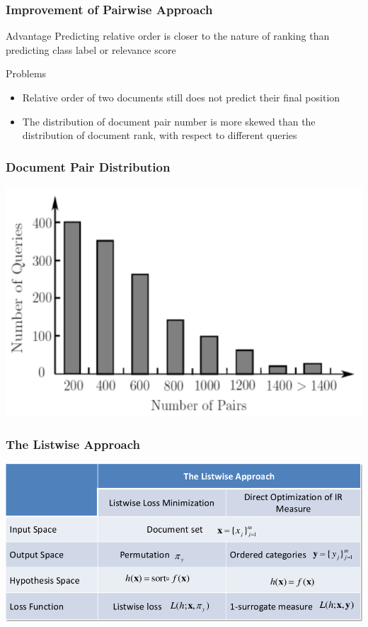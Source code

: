 \documentclass{beamer}
\begin{document}
\begin{frame}
    \frametitle{Improvement of Pairwise Approach}
    \begin{block}{Advantage}
        Predicting relative order is closer to the nature of ranking than
        predicting class label or relevance score
    \end{block}
    \begin{block}{Problems}
        \begin{itemize}
        \item Relative order of two documents still does not predict their
            final position
        \item The distribution of document pair number is more skewed than the
            distribution of document rank, with respect to different queries
        \end{itemize}
    \end{block}
\end{frame}

\begin{frame}
    \frametitle{Document Pair Distribution}
    \centering
    \includegraphics[width=\linewidth]{pair_distribution}
\end{frame}

\begin{frame}
    \frametitle{The Listwise Approach}
    \centering
    \includegraphics[width=\linewidth]{listwise}
\end{frame}
\end{document}
